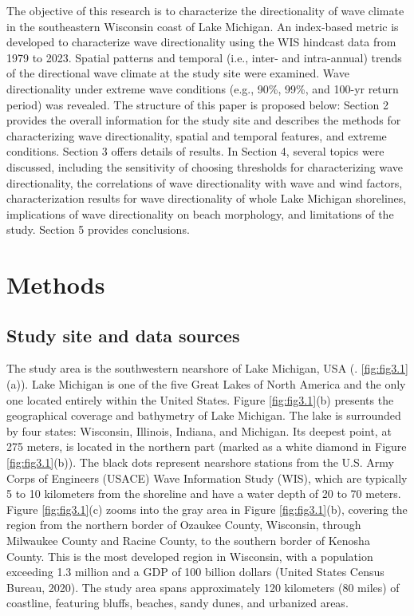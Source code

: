 The objective of this research is to characterize the directionality of wave climate in the southeastern Wisconsin coast of Lake Michigan. An index-based metric is developed to characterize wave directionality using the WIS hindcast data from 1979 to 2023. Spatial patterns and temporal (i.e., inter- and intra-annual) trends of the directional wave climate at the study site were examined. Wave directionality under extreme wave conditions (e.g., 90\%, 99\%, and 100-yr return period) was revealed. The structure of this paper is proposed below: Section 2 provides the overall information for the study site and describes the methods for characterizing wave directionality, spatial and temporal features, and extreme conditions. Section 3 offers details of results. In Section 4, several topics were discussed, including the sensitivity of choosing thresholds for characterizing wave directionality, the correlations of wave directionality with wave and wind factors, characterization results for wave directionality of whole Lake Michigan shorelines, implications of wave directionality on beach morphology, and limitations of the study. Section 5 provides conclusions.

\section{Methods}
\label{c3_Methods}

\subsection{Study site and data sources}
\label{c3_Study site and data sources}
The study area is the southwestern nearshore of Lake Michigan, USA (. \ref{fig:fig3.1}(a)). Lake Michigan is one of the five Great Lakes of North America and the only one located entirely within the United States. Figure \ref{fig:fig3.1}(b) presents the geographical coverage and bathymetry of Lake Michigan. The lake is surrounded by four states: Wisconsin, Illinois, Indiana, and Michigan. Its deepest point, at 275 meters, is located in the northern part (marked as a white diamond in Figure \ref{fig:fig3.1}(b)). The black dots represent nearshore stations from the U.S. Army Corps of Engineers (USACE) Wave Information Study (WIS), which are typically 5 to 10 kilometers from the shoreline and have a water depth of 20 to 70 meters. Figure \ref{fig:fig3.1}(c) zooms into the gray area in Figure \ref{fig:fig3.1}(b), covering the region from the northern border of Ozaukee County, Wisconsin, through Milwaukee County and Racine County, to the southern border of Kenosha County. This is the most developed region in Wisconsin, with a population exceeding 1.3 million and a GDP of 100 billion dollars (United States Census Bureau, 2020). The study area spans approximately 120 kilometers (80 miles) of coastline, featuring bluffs, beaches, sandy dunes, and urbanized areas. 


